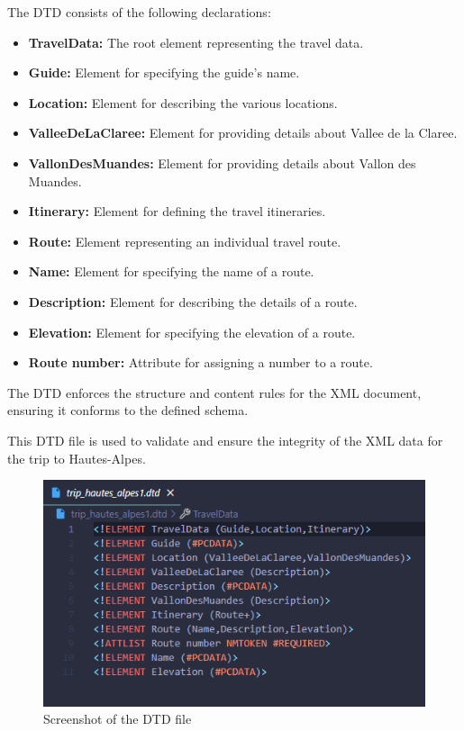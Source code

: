 \documentclass[12pt]{report}
\begin{document}
\medskip The DTD consists of the following declarations:
\begin{itemize}
	

\item  \textbf{\textbf{TravelData:}} The root element representing the travel data.
\item  \textbf{Guide:} Element for specifying the guide's name.
\item  \textbf{Location:} Element for describing the various locations.
\item  \textbf{ValleeDeLaClaree:} Element for providing details about Vallee de la Claree.
\item  \textbf{VallonDesMuandes:} Element for providing details about Vallon des Muandes.
\item  \textbf{Itinerary:} Element for defining the travel itineraries.
\item  \textbf{Route:} Element representing an individual travel route.
\item  \textbf{Name:} Element for specifying the name of a route.
\item  \textbf{Description:} Element for describing the details of a route.
\item  \textbf{Elevation:} Element for specifying the elevation of a route.
\item  \textbf{Route number:} Attribute for assigning a number to a route.
\end{itemize}
The DTD enforces the structure and content rules for the XML document, ensuring it conforms to the defined schema.

This DTD file is used to validate and ensure the integrity of the XML data for the trip to Hautes-Alpes.
\begin{figure}[htbp]
	\centering
	\includegraphics[width=1.0\textwidth]{dtd.png}
	\caption{Screenshot of the DTD file}
	\label{fig:screenshot1}
  \end{figure}
  \clearpage
\end{document}
